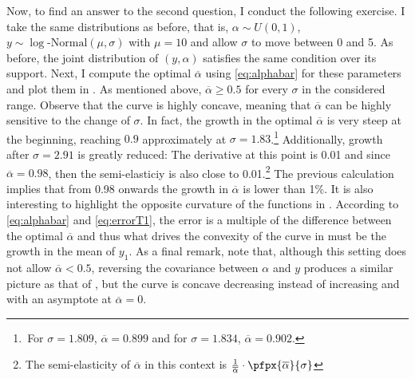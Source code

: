 \documentclass[english, a4paper, 12pt]{article}
\begin{document}
Now, to find an answer to the second question, I conduct the following exercise. I take the same distributions as before, that is, $\alpha \sim U(0,1)$, $y \sim \log\text{-Normal}(\mu, \sigma)$ with $\mu = 10$ and allow $\sigma$ to move between 0 and 5. As before, the joint distribution of $(y,\alpha)$ satisfies the same condition over its support. Next, I compute the optimal $\overline{\alpha}$ using \eqref{eq:alphabar} for these parameters and plot them in . As mentioned above, $\overline{\alpha} \geq 0.5$ for every $\sigma$ in the considered range. Observe that the curve is highly concave, meaning that $\overline{\alpha}$ can be highly sensitive to the change of $\sigma$. In fact, the growth in the optimal $\overline{\alpha}$ is very steep at the beginning, reaching $0.9$ approximately at $\sigma = 1.83$.\footnote{\,For $\sigma = 1.809$, $\overline{\alpha} = 0.899$ and for $\sigma = 1.834$, $\overline{\alpha} = 0.902$.} Additionally, growth after $\sigma = 2.91$ is greatly reduced: The derivative at this point is 0.01 and since $\overline{\alpha} = 0.98$, then the semi-elasticiy is also close to 0.01.\footnote{The semi-elasticity of $\overline{\alpha}$ in this context is $\frac{1}{\overline{\alpha}} \cdot \pfpx{\overline{\alpha}}{\sigma}$} The previous calculation implies that from 0.98 onwards the growth in $\overline{\alpha}$ is lower than 1\%.  It is also interesting to highlight the opposite curvature of the functions in . According to \eqref{eq:alphabar} and \eqref{eq:errorT1}, the error is a multiple of the difference between the optimal $\overline{\alpha}$ and thus what drives the convexity of the curve in  must be the growth in the mean of $y_{1}$. As a final remark, note that, although this setting does not allow $\overline{\alpha} < 0.5$, reversing the covariance between $\alpha$ and $y$ produces a similar picture as that of , but the curve is concave decreasing instead of increasing and with an asymptote at $\overline{\alpha} = 0$.
\end{document}
